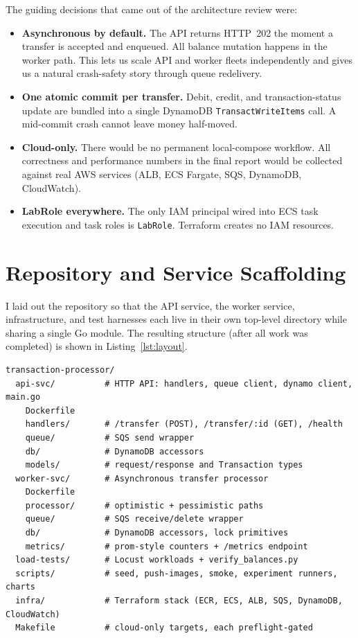 \documentclass[11pt,a4paper]{article}
\begin{document}
The guiding decisions that came out of the architecture review were:
\begin{itemize}[leftmargin=*, itemsep=0.2em]
    \item \textbf{Asynchronous by default.} The API returns HTTP~202 the moment a transfer is accepted and enqueued. All balance mutation happens in the worker path. This lets us scale API and worker fleets independently and gives us a natural crash-safety story through queue redelivery.
    \item \textbf{One atomic commit per transfer.} Debit, credit, and transaction-status update are bundled into a single DynamoDB \texttt{TransactWriteItems} call. A mid-commit crash cannot leave money half-moved.
    \item \textbf{Cloud-only.} There would be no permanent local-compose workflow. All correctness and performance numbers in the final report would be collected against real AWS services (ALB, ECS Fargate, SQS, DynamoDB, CloudWatch).
    \item \textbf{LabRole everywhere.} The only IAM principal wired into ECS task execution and task roles is \texttt{LabRole}. Terraform creates no IAM resources.
\end{itemize}

\section{Repository and Service Scaffolding}

I laid out the repository so that the API service, the worker service, infrastructure, and test harnesses each live in their own top-level directory while sharing a single Go module. The resulting structure (after all work was completed) is shown in Listing~\ref{lst:layout}.

\begin{lstlisting}[caption={Repository layout.}, label={lst:layout}]
transaction-processor/
  api-svc/          # HTTP API: handlers, queue client, dynamo client, main.go
    Dockerfile
    handlers/       # /transfer (POST), /transfer/:id (GET), /health
    queue/          # SQS send wrapper
    db/             # DynamoDB accessors
    models/         # request/response and Transaction types
  worker-svc/       # Asynchronous transfer processor
    Dockerfile
    processor/      # optimistic + pessimistic paths
    queue/          # SQS receive/delete wrapper
    db/             # DynamoDB accessors, lock primitives
    metrics/        # prom-style counters + /metrics endpoint
  load-tests/       # Locust workloads + verify_balances.py
  scripts/          # seed, push-images, smoke, experiment runners, charts
  infra/            # Terraform stack (ECR, ECS, ALB, SQS, DynamoDB, CloudWatch)
  Makefile          # cloud-only targets, each preflight-gated
\end{lstlisting}
\end{document}
